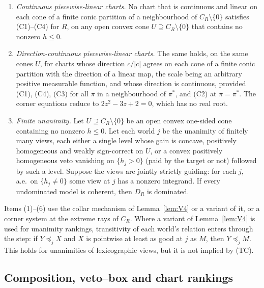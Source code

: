 \documentclass[11pt]{article}
\theoremstyle{plain}
\theoremstyle{definition}
\theoremstyle{remark}
\begin{document}
\begin{enumerate}[label=(\arabic*)]
  forces $D_K$ to be orthant-planar. The argument uses only gambles that are not sure
  losses. Since $R$ is not orthant-planar (Lemma~\ref{lem:planarobs}(d)), with
  Theorem~\ref{thm:dichotomy} no such chart meets the certificate for $R$ on any domain
  that is not essentially one-sided.
  \item \emph{Continuous piecewise-linear charts.} No chart that is continuous and linear
  on each cone of a finite conic partition of a neighbourhood of $C_R\setminus\{0\}$
  satisfies (C1)--(C4) for $R$, on any open convex cone $U\supseteq C_R\setminus\{0\}$ that
  contains no nonzero $h\le0$.
  \item \emph{Direction-continuous piecewise-linear charts.} The same holds, on the same
  cones $U$, for charts whose direction $c/|c|$ agrees on each cone of a finite conic
  partition with the direction of a linear map, the scale being an arbitrary positive
  measurable function, and whose direction is continuous, provided (C1), (C4), (C3) for
  all $\pi$ in a neighbourhood of $\pi^\ast$, and (C2) at $\pi=\pi^\ast$. The corner
  equations reduce to $2z^2-3z+2=0$, which has no real root.
  \item\label{it:unanimity} \emph{Finite unanimity.} Let $U\supseteq C_R\setminus\{0\}$ be
  an open convex one-sided cone containing no nonzero $h\le0$. Let each world $j$ be the
  unanimity of finitely many views, each either a single level whose gain is concave,
  positively homogeneous and weakly sign-correct on $U$, or a convex positively
  homogeneous veto vanishing on $\{h_j>0\}$ (paid by the target or not) followed by such a
  level. Suppose the views are jointly strictly guiding: for each $j$, a.e.\ on $\{h_j\ne
  0\}$ some view at $j$ has a nonzero integrand. If every undominated model is coherent,
  then $D_R$ is dominated.
\end{enumerate}
Items (1)--(6) use the collar mechanism of Lemma~\ref{lem:V4} or a variant of it, or a
corner system at the extreme rays of $C_R$. Where a variant of Lemma~\ref{lem:V4} is used
for unanimity rankings, transitivity of each world's relation enters through the step: if
$Y\preceq_jX$ and $X$ is pointwise at least as good at $j$ as $M$, then $Y\preceq_jM$.
This holds for unanimities of lexicographic views, but it is not implied by (TC).

\subsection{Composition, veto--box and chart rankings}\label{sec:excl-comp}
\end{document}
